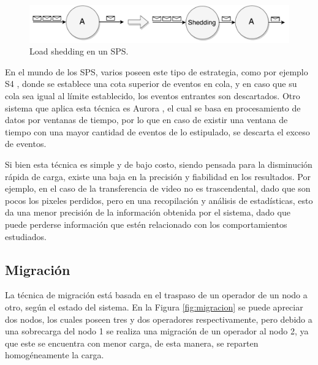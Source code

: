 \begin{figure}[!ht]
	\centering
	\includegraphics[scale=0.6]{images/LoadShedding.pdf}
	\caption{Load shedding en un SPS.}
	\label{fig:loadShedding}
\end{figure}

En el mundo de los SPS, varios poseen este tipo de estrategia, como por ejemplo S4 \citep{s4}, donde se establece una cota superior de eventos en cola, y en caso que su cola sea igual al límite establecido, los eventos entrantes son descartados. Otro sistema que aplica esta técnica es Aurora \citep{aurora}, el cual se basa en procesamiento de datos por ventanas de tiempo, por lo que en caso de existir una ventana de tiempo con una mayor cantidad de eventos de lo estipulado, se descarta el exceso de eventos.

Si bien esta técnica es simple y de bajo costo, siendo pensada para la disminución rápida de carga, existe una baja en la precisión y fiabilidad en los resultados. Por ejemplo, en el caso de la transferencia de video no es trascendental, dado que son pocos los pixeles perdidos, pero en una recopilación y análisis de estadísticas, esto da una menor precisión de la información obtenida por el sistema, dado que puede perderse información que estén relacionado con los comportamientos estudiados.

\subsection{Migración}
\label{sec:migracionBC}

La técnica de migración está basada en el traspaso de un operador de un nodo a otro, según el estado del sistema. En la Figura \ref{fig:migracion} se puede apreciar dos nodos, los cuales poseen tres y dos operadores respectivamente, pero debido a una sobrecarga del nodo 1 se realiza una migración de un operador al nodo 2, ya que este se encuentra con menor carga, de esta manera, se reparten homogéneamente la carga.

